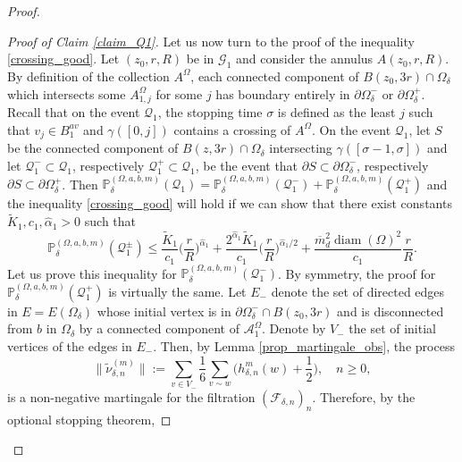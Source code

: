 \documentclass{article}
\newcommand{\PP}{{\mathbb{P}}}
\theoremstyle{definition}
\theoremstyle{remark}
\theoremstyle{remark}
\begin{document}
\begin{proof}
\begin{proof}[Proof of Claim \ref{claim_Q1}]
Let us now turn to the proof of the inequality \eqref{crossing_good}. Let $(z_0,r,R)$ be in $\mathcal{G}_1$ and consider the annulus $A(z_0,r,R)$. By definition of the collection $A^{\Omega}$, each connected component of $B(z_0,3r) \cap \Omega_{\delta}$ which intersects some $A_{1,j}^{\Omega}$ for some $j$ has boundary entirely in $\partial \Omega_{\delta}^{-}$ or $\partial \Omega_{\delta}^{+}$. Recall that on the event $\mathcal{Q}_1$, the stopping time $\sigma$ is defined as the least $j$ such that $v_j \in B_1^{av}$ and $\gamma([0,j])$ contains a crossing of $A^{\Omega}$. On the event $\mathcal{Q}_1$, let $S$ be the connected component of $B(z,3r) \cap \Omega_{\delta}$ intersecting $\gamma([\sigma-1, \sigma])$ and let $\mathcal{Q}_{1}^{-} \subset \mathcal{Q}_1$, respectively $\mathcal{Q}_1^{+} \subset \mathcal{Q}_{1}$, be the event that $\partial S \subset \partial \Omega_{\delta}^{-}$, respectively $\partial S \subset \partial \Omega_{\delta}^{+}$. Then $\PP_{\delta}^{(\Omega,a,b,m)}(\mathcal{Q}_1) = \PP_{\delta}^{(\Omega,a,b,m)}(\mathcal{Q}_{1}^{-}) + \PP_{\delta}^{(\Omega,a,b,m)}(\mathcal{Q}_{1}^{+})$ and the inequality \eqref{crossing_good} will hold if we can show that there exist constants $\tilde K_1, c_1, \hat \alpha_1 > 0$ such that
\begin{equation*} \label{ineq_Q1}
    \PP_{\delta}^{(\Omega,a,b,m)}(\mathcal{Q}_{1}^{\pm}) \leq  \frac{\tilde K_1}{c_1}\bigg(\frac{r}{R}\bigg)^{\hat \alpha_1}+ \frac{2^{\hat \alpha_1}\tilde K_1}{c_1}\bigg(\frac{r}{R} \bigg)^{\hat \alpha_1 /2} + \frac{\overline{m}_d^{2}\operatorname{diam}(\Omega)^2}{c_1}\frac{r}{R}.
\end{equation*}
Let us prove this inequality for $\PP_{\delta}^{(\Omega,a,b,m)}(\mathcal{Q}_{1}^{-})$. By symmetry, the proof for $\PP_{\delta}^{(\Omega,a,b,m)}(\mathcal{Q}_{1}^{+})$ is virtually the same. Let $E_{-}$ denote the set of directed edges in $E=E(\Omega_{\delta})$ whose initial vertex is in $\partial \Omega_{\delta}^{-} \cap B(z_0,3r)$ and is disconnected from $b$ in $\Omega_{\delta}$ by a connected component of $\mathcal{A}_{1}^{\Omega}$. Denote by $V_{-}$ the set of initial vertices of the edges in $E_{-}$. Then, by Lemma \ref{prop_martingale_obs}, the process
\begin{equation*}
    \| \tilde \nu_{\delta, n}^{(m)} \| := \sum_{v \in V_{-}} \frac{1}{6} \sum_{v \sim w} \bigg( h_{\delta, n}^{m}(w) + \frac{1}{2} \bigg), \quad n \geq 0,
\end{equation*}
is a non-negative martingale for the filtration $(\mathcal{F}_{\delta, n})_n$. Therefore, by the optional stopping theorem,

\end{proof}
\end{proof}
\end{document}

